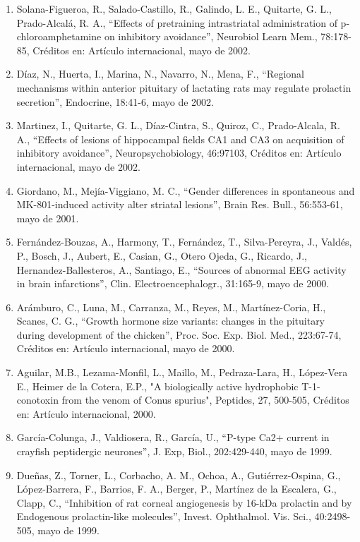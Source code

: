 \begin{enumerate}
\item Solana-Figueroa, R., Salado-Castillo, R., Galindo, L. E., Quitarte, G. L., Prado-Alcalá, R. A., “Effects of pretraining 
intrastriatal administration of p-chloroamphetamine on inhibitory avoidance”, Neurobiol Learn Mem., 78:178-85, Créditos en: 
Artículo internacional, mayo de 2002.

\item Díaz, N., Huerta, I., Marina, N., Navarro, N., Mena, F., “Regional mechanisms within anterior pituitary of lactating 
rats 
may regulate prolactin secretion”, Endocrine, 18:41-6,    mayo de 2002.

\item Martinez, I., Quitarte, G. L., Díaz-Cintra, S., Quiroz, C., Prado-Alcala, R. A., “Effects of lesions of hippocampal 
fields CA1 and CA3 on acquisition of inhibitory avoidance”, Neuropsychobiology, 46:97103, Créditos en: Artículo 
internacional, mayo de 2002.

\item Giordano, M., Mejía-Viggiano, M. C., “Gender differences in spontaneous and MK-801-induced activity alter striatal 
lesions”, Brain Res. Bull., 56:553-61,    mayo de 2001.

\item Fernández-Bouzas, A., Harmony, T., Fernández, T., Silva-Pereyra, J., Valdés, P., Bosch, J., Aubert, E., Casian, G., 
Otero Ojeda, G., Ricardo, J., Hernandez-Ballesteros, A., Santiago, E., “Sources of abnormal EEG activity in brain 
infarctions”, Clin. Electroencephalogr., 31:165-9,    mayo de 2000.

\item Arámburo, C., Luna, M., Carranza, M., Reyes, M., Martínez-Coria, H., Scanes, C. G., “Growth hormone size variants: 
changes in the pituitary during development of the chicken”, Proc. Soc. Exp. Biol. Med., 223:67-74, Créditos en: Artículo 
internacional, mayo de 2000.

\item Aguilar, M.B., Lezama-Monfil, L., Maillo, M., Pedraza-Lara, H., López-Vera E., Heimer de la Cotera, E.P., "A 
biologically active hydrophobic T-1-conotoxin from the venom of Conus spurius", Peptides, 27, 500-505, Créditos en: Artículo 
internacional, 2000.

\item García-Colunga, J., Valdiosera, R., García, U., “P-type Ca2+ current in crayfish peptidergic neurones”, J. Exp, Biol., 
202:429-440,    mayo de 1999.

\item Dueñas, Z., Torner, L., Corbacho, A. M., Ochoa, A., Gutiérrez-Ospina, G., López-Barrera, F., Barrios, F. A., Berger, 
P., 
Martínez de la Escalera, G., Clapp, C., “Inhibition of rat corneal angiogenesis by 16-kDa prolactin and by Endogenous 
prolactin-like molecules”, Invest. Ophthalmol. Vis. Sci., 40:2498-505,    mayo de 1999.


\end{enumerate}
